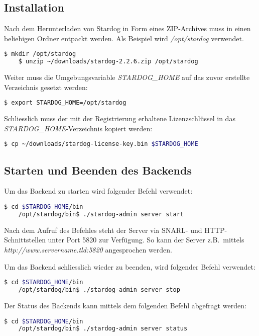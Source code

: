 \subsection{Installation}
\label{chap:anh:ihb:backend:inst}
Nach dem Herunterladen von Stardog in Form eines ZIP-Archives muss in einen beliebigen Ordner entpackt werden. Als Beispiel wird \textit{/opt/stardog} verwendet.
\begin{lstlisting}[language=bash]
    $ mkdir /opt/stardog
    $ unzip ~/downloads/stardog-2.2.6.zip /opt/stardog
\end{lstlisting}

Weiter muss die Umgebungsvariable \textit{STARDOG\_HOME} auf das zuvor erstellte Verzeichnis gesetzt werden:
\begin{lstlisting}[language=bash]
    $ export STARDOG_HOME=/opt/stardog
\end{lstlisting}

Schliesslich muss der mit der Registrierung erhaltene Lizenzschlüssel in das \textit{STARDOG\_HOME}-Verzeichnis kopiert werden:
\begin{lstlisting}[language=bash]
    $ cp ~/downloads/stardog-license-key.bin $STARDOG_HOME
\end{lstlisting}

\subsection{Starten und Beenden des Backends}
\label{chap:anh:ihb:backend:start}
Um das Backend zu starten wird folgender Befehl verwendet:
\begin{lstlisting}[language=bash]
                    $ cd $STARDOG_HOME/bin
    /opt/stardog/bin$ ./stardog-admin server start
\end{lstlisting}
Nach dem Aufruf des Befehles steht der Server via SNARL- und HTTP-Schnittstellen unter Port 5820 zur Verfügung. So kann der Server z.B.\ mittels \textit{http://www.servername.tld:5820} angesprochen werden.

Um das Backend schliesslich wieder zu beenden, wird folgender Befehl verwendet:
\begin{lstlisting}[language=bash]
                    $ cd $STARDOG_HOME/bin
    /opt/stardog/bin$ ./stardog-admin server stop
\end{lstlisting}

Der Status des Backends kann mittels dem folgenden Befehl abgefragt werden:
\begin{lstlisting}[language=bash]
                    $ cd $STARDOG_HOME/bin
    /opt/stardog/bin$ ./stardog-admin server status
\end{lstlisting}

